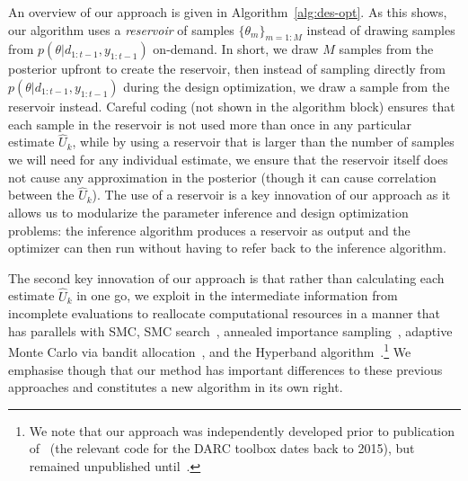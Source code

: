 An overview of our approach is given in Algorithm~\ref{alg:des-opt}.  As this shows, our algorithm uses
a \emph{reservoir} of samples $\{\theta_m\}_{m=1:M}$ instead of drawing samples from 
$p\left(\theta | d_{1:t-1}, y_{1:t-1} \right)$ on-demand.  In short, we draw $M$ samples from the
posterior upfront to create the reservoir, then instead of sampling directly from 
$p\left(\theta | d_{1:t-1}, y_{1:t-1} \right)$ during the design optimization,
we draw a sample from the reservoir instead.  Careful coding (not shown in the algorithm block) ensures 
that each sample in the reservoir is not used more than once in any particular estimate $\hat{U}_k$, while by using
a reservoir that is larger than the number of samples we will need for any individual estimate, we
ensure that the reservoir itself does not cause any approximation in the posterior (though it can cause correlation
between the $\hat{U}_k$).
The use of a reservoir is a key innovation of our approach as it allows
us to modularize the parameter inference and design optimization problems: the inference algorithm
produces a reservoir as output and the optimizer can then run without having to refer back to the
inference algorithm.

The second key innovation of our approach is that rather than calculating each estimate $\hat{U}_k$ in one go, we
exploit in the intermediate information from incomplete evaluations to reallocate computational
resources in a manner that has parallels with SMC, SMC search~\citep{amzal2006bayesian}, annealed
importance sampling~\citep{neal2001annealed}, adaptive Monte Carlo via bandit 
allocation~\cite{neufeld2014adaptive}, and the Hyperband algorithm~\citep{li2016hyperband}.\footnote{We
	note that our approach was independently developed prior to publication of~\cite{li2016hyperband} (the relevant
	code for the DARC toolbox dates back to 2015), but remained unpublished until~\cite{vincent2017darc}.}
We emphasise though that our method has important differences
to these previous approaches and constitutes a new algorithm in its own right.

